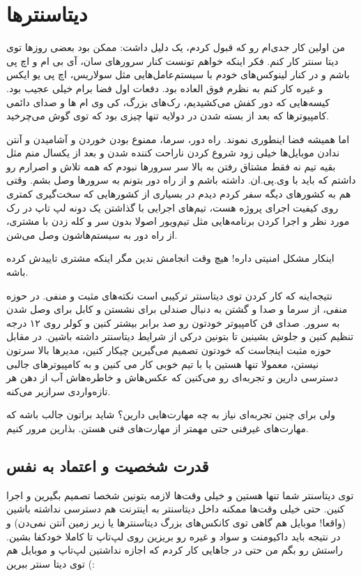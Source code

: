 \section{دیتاسنترها}
من اولین کار جدی‌ام رو که قبول کردم، یک دلیل داشت: ممکن بود بعضی روزها توی دیتا سنتر کار کنم. فکر اینکه خواهم تونست کنار سرورهای سان، آی بی ام و اچ پی باشم و در کنار لینوکس‌های خودم با سیستم‌عامل‌هایی مثل سولاریس، اچ پی یو ایکس و غیره کار کنم به نظرم فوق العاده بود. دفعات اول فضا برام خیلی عجیب بود. کیسه‌هایی که دور کفش می‌کشیدیم، رک‌های بزرگ، کی وی ام ها و صدای دائمی  کامپیوترها که بعد از بسته شدن در دولایه تنها چیزی بود که توی گوش می‌چرخید.

اما همیشه فضا اینطوری نموند. راه دور، سرما، ممنوع بودن خوردن و آشامیدن و آنتن ندادن موبایل‌ها خیلی زود شروع کردن ناراحت کننده شدن و بعد از یکسال منم مثل بقیه تیم نه فقط مشتاق رفتن به بالا سر سرورها نبودم که همه تلاش و اصرارم رو داشتم که باید با وی.پی.ان. داشته باشم و از راه دور بتونم به سرورها وصل بشم. وقتی هم به کشورهای دیگه سفر کردم دیدم در بسیاری از کشورهایی که سخت‌گیری کمتری روی کیفیت اجرای پروژه‌ هست، تیم‌های اجرایی با گذاشتن یک دونه لپ تاپ در رک مورد نظر و اجرا کردن برنامه‌هایی مثل تیم‌ویور اصولا بدون سر و کله زدن با مشتری، از راه دور به سیستم‌هاشون وصل می‌شن.

اینکار مشکل امنیتی داره! هیچ وقت انجامش ندین مگر اینکه مشتری تاییدش کرده باشه.

نتیجه‌اینه که کار کردن توی دیتاسنتر ترکیبی است نکته‌های مثبت و منفی. در حوزه منفی، از سرما و صدا و گشتن به دنبال صندلی برای نشستن و کابل برای وصل شدن به سرور. صدای فن کامپیوتر خودتون رو صد برابر بیشتر کنین و کولر روی ۱۲ درجه تنظیم کنین و جلوش بشینین تا بتونین درکی از شرایط دیتاسنتر داشته باشین. در مقابل حوزه مثبت اینجاست که خودتون تصمیم می‌گیرین چیکار کنین، مدیرها بالا سرتون نیستن، معمولا تنها هستین یا با تیم خوبی کار می کنین و به کامپیوترهای جالبی دسترسی دارین و تجربه‌ای رو می‌کنین که عکس‌هاش و خاطره‌هاش آب از دهن هر تازه‌واردی سرازیر می‌کنه.

ولی برای چنین تجربه‌ای نیاز به چه مهارت‌هایی دارین؟ شاید براتون جالب باشه که مهارت‌های غیرفنی حتی مهمتر از مهارت‌های فنی هستن. بذارین مرور کنیم.
\subsection*{قدرت شخصیت و اعتماد به نفس}
توی دیتاسنتر شما تنها هستین و خیلی وقت‌ها لازمه بتونین شخصا تصمیم بگیرین و اجرا کنین. حتی خیلی وقت‌ها ممکنه داخل دیتاسنتر به اینترنت هم دسترسی نداشته باشین (واقعا!‌ موبایل هم گاهی توی کانکس‌های بزرگ دیتاسنترها یا زیر زمین آنتن نمی‌دن) و در نتیجه باید داکیومنت و سواد و غیره رو بریزین روی لپ‌تاپ تا کاملا خودکفا بشین. راستش رو بگم من حتی در جاهایی کار کردم که اجازه نداشتین لپ‌تاپ و موبایل هم توی دیتا سنتر ببرین (:

